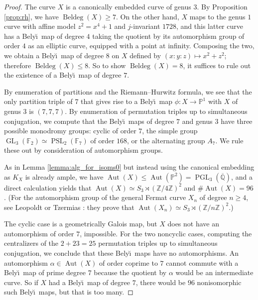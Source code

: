 \documentclass{amsproc}
\numberwithin{equation}{section}
\numberwithin{figure}{section}
\theoremstyle{definition}
\theoremstyle{remark}
\DeclareMathOperator{\Beldeg}{Beldeg}
\newcommand{\Bdeg}{\Beldeg}
\DeclareMathOperator{\Aut}{Aut}
\DeclareMathOperator{\PSL}{PSL}
\DeclareMathOperator{\GL}{GL}
\DeclareMathOperator{\PGL}{PGL}
\newcommand{\Qbar}{\overline{\mathbb{Q}}}
\newcommand\FF{\mathbb{F}}
\newcommand\PP{\mathbb{P}}
\newcommand\ZZ{\mathbb{Z}}
\renewcommand{\leq}{\leqslant}
\renewcommand{\geq}{\geqslant}
\newcommand{\Belyi}{Bely\u{\i}}
\newcommand{\aj}[1]{{\color{magenta} \textsf{[[#1]]}}}
\begin{document}
\begin{proof}
The curve $X$ is a canonically embedded curve of genus $3$.  By Proposition \ref{prop:rh}, we have $\Bdeg(X) \geq 7$.  On the other hand, $X$ maps to the genus $1$ curve with affine model $z^2=x^4+1$ and $j$-invariant $1728$, and this latter curve has a \Belyi\ map of degree $4$ taking the quotient by its automorphism group of order $4$ as an elliptic curve, equipped with a point at infinity.  Composing the two, we obtain a \Belyi\ map of degree $8$ on $X$ defined by $(x:y:z) \mapsto x^2+z^2$; therefore $\Beldeg(X) \leq 8$. 
So to show $\Beldeg(X)=8$, it suffices to rule out the existence of a \Belyi\ map of degree $7$.  

By enumeration of partitions and the Riemann--Hurwitz formula, we see that the only partition triple of $7$ that gives rise to a \Belyi\ map $\phi\colon X \to \PP^1$ with $X$ of genus $3$ is $(7,7,7)$.  
By enumeration of permutation triples up to simultaneous conjugation, we compute that the \Belyi\ maps of degree $7$ and genus $3$ have three possible monodromy groups: cyclic of order $7$, the simple group $\GL_3(\FF_2) \simeq \PSL_2(\FF_7)$ of order $168$, or the alternating group $A_7$.  We rule these out by consideration of automorphism groups.

As in Lemma \ref{lemma:alg_for_isoms0} but instead using the canonical embedding as $K_X$ is already ample, we have $\Aut(X) \leq \Aut(\PP^2)=\PGL_3(\Qbar)$, and a direct calculation yields that $\Aut(X) \simeq S_3 \rtimes (\ZZ/4\ZZ)^2$ and $\#\Aut(X)=96$.  (For the automorphism group of the general Fermat curve $X_n$ of degree $n \geq 4$, see Leopoldt \cite{Leopoldt} or Tzermias \cite{Tzermias}: they prove that $\Aut(X_n) \simeq S_3 \rtimes (\ZZ/n\ZZ)^2$.)  

The cyclic case is a geometrically Galois map, but $X$ does not have an automorphism of order $7$, impossible.  For the two noncyclic cases, computing the centralizers of the $2+23=25$ permutation triples up to simultaneous conjugation, we conclude that these \Belyi\ maps have no automorphisms.  An automorphism $\alpha \in \Aut(X)$ of order coprime to $7$ cannot commute with a \Belyi\ map of prime degree $7$ because the quotient by $\alpha$ would be an intermediate curve.  So if $X$ had a \Belyi\ map of degree $7$, there would be $96$ nonisomorphic such \Belyi\ maps, but that is too many.  
\end{proof}
\end{document}

